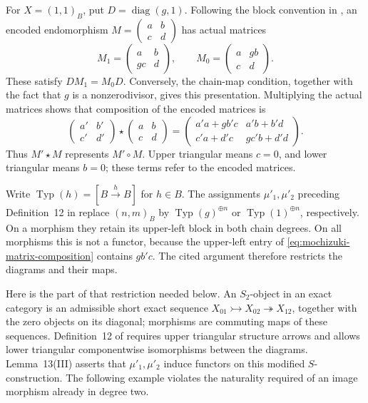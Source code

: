 For $X=(1,1)_B$, put $D=\operatorname{diag}(g,1)$. Following the
block convention in \cite[Conventions~11, equations~(15)--(16)]{Mochizuki2020},
an encoded endomorphism
$M=\left(\begin{smallmatrix}a&b\\c&d\end{smallmatrix}\right)$ has
actual matrices
\begin{equation}\label{eq:mochizuki-chain-matrices}
 M_1=\begin{pmatrix}a&b\\gc&d\end{pmatrix},
 \qquad
 M_0=\begin{pmatrix}a&gb\\c&d\end{pmatrix}.
\end{equation}
These satisfy $DM_1=M_0D$. Conversely, the chain-map condition, together
with the fact that $g$ is a nonzerodivisor, gives this presentation.
Multiplying the actual matrices shows that composition of the encoded
matrices is
\begin{equation}\label{eq:mochizuki-matrix-composition}
 \begin{pmatrix}a'&b'\\c'&d'\end{pmatrix}
 \star
 \begin{pmatrix}a&b\\c&d\end{pmatrix}
 =
 \begin{pmatrix}
 a'a+gb'c&a'b+b'd\\
 c'a+d'c&gc'b+d'd
 \end{pmatrix}.
\end{equation}
Thus $M'\star M$ represents $M'\circ M$. Upper triangular means
$c=0$, and lower triangular means $b=0$; these terms refer to the
encoded matrices.

Write $\operatorname{Typ}(h)=[B\xrightarrow{h}B]$ for $h\in B$.
The assignments $\mu'_1,\mu'_2$ preceding Definition~12 in
\cite{Mochizuki2020} replace $(n,m)_B$ by
$\operatorname{Typ}(g)^{\oplus n}$ or
$\operatorname{Typ}(1)^{\oplus n}$, respectively. On a morphism they
retain its upper-left block in both chain degrees. On all morphisms
this is not a functor, because the upper-left entry of
\eqref{eq:mochizuki-matrix-composition} contains $gb'c$.
The cited argument therefore restricts the diagrams and their maps.

Here is the part of that restriction needed below. An $S_2$-object in
an exact category is an admissible short exact sequence
$X_{01}\rightarrowtail X_{02}\twoheadrightarrow X_{12}$, together
with the zero objects on its diagonal; morphisms are commuting maps
of these sequences. Definition~12 of \cite{Mochizuki2020} requires
upper triangular structure arrows and allows lower triangular
componentwise isomorphisms between the diagrams. Lemma~13(III) asserts
that $\mu'_1,\mu'_2$ induce functors on this modified $S$-construction.
The following example violates the naturality required of an image
morphism already in degree two.

